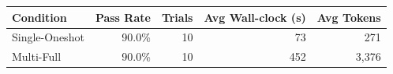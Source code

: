 \begin{tabular}{@{}lrrrr@{}}
\toprule
Condition & Pass Rate & Trials & Avg Wall-clock (s) & Avg Tokens \\
\midrule
Single-Oneshot & 90.0\% & 10 & 73 & 271 \\
Multi-Full & 90.0\% & 10 & 452 & 3,376 \\
\bottomrule
\end{tabular}

